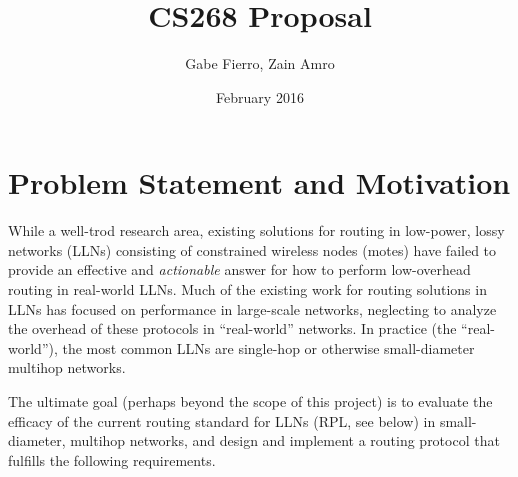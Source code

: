 \documentclass[10pt]{article}
\title{CS268 Proposal}
\author{Gabe Fierro, Zain Amro}
\date{February 2016}
\begin{document}
\setlength{\droptitle}{-8em}

\maketitle

\section{Problem Statement and Motivation}


While a well-trod research area, existing solutions for routing in low-power, lossy networks (LLNs) consisting of constrained wireless nodes (motes) have failed to provide an effective and \emph{actionable} answer for how to perform low-overhead routing in real-world LLNs. Much of the existing work for routing solutions in LLNs has focused on performance in large-scale networks, neglecting to analyze the overhead of these protocols in ``real-world'' networks. In practice (the ``real-world''), the most common LLNs are single-hop or otherwise small-diameter multihop networks.

The ultimate goal (perhaps beyond the scope of this project) is to evaluate the efficacy of the current routing standard for LLNs (RPL, see below) in small-diameter, multihop networks, and design and implement a routing protocol that fulfills the following requirements.
\end{document}
